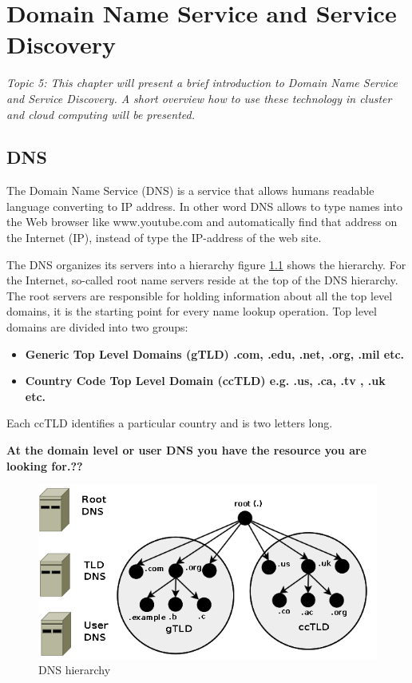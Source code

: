 \chapter{Domain Name Service and Service Discovery}\label{ch:dns}
\textit{Topic 5: This chapter will present a brief introduction to Domain Name Service and Service Discovery. A short overview how to use these technology in cluster and cloud computing will be presented.} 
	
\section{DNS}
The Domain Name Service (DNS) is a service that allows humans readable language converting to IP address. In other word DNS allows to type names into the Web browser like www.youtube.com and automatically find that address on the Internet (IP), instead of type the IP-address of the web site.

The DNS organizes its servers into a hierarchy figure \ref{fig:DNShierarchy} shows the hierarchy. For the Internet, so-called root name servers reside at the top of the DNS hierarchy. The root servers are responsible for holding information about all the top level domains, it is the starting point for every name lookup operation. Top level domains are divided into two groups:

\begin{itemize}
	\item \textbf{Generic Top Level Domains (gTLD) .com, .edu, .net, .org, .mil etc.}
	\item \textbf{ Country Code Top Level Domain (ccTLD) e.g. .us, .ca, .tv , .uk etc.}
\end{itemize}
Each ccTLD identifies a particular country and is two letters long.   

\textbf{At the domain level or user DNS you have the resource you are looking for.??
}

\begin{figure}[bth]
	\includegraphics[width=1\linewidth]{gfx/DNShierarchy}
	\caption[routingtable]{DNS hierarchy} \label{fig:DNShierarchy}
\end{figure}

